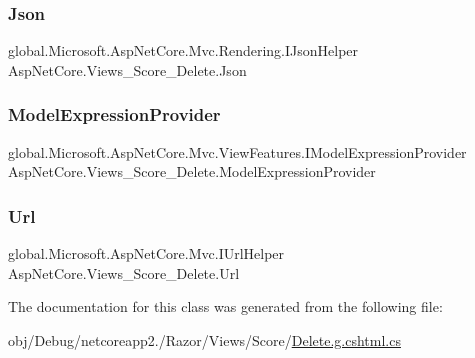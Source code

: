 \subsubsection{\texorpdfstring{Json}{Json}}
{\footnotesize\ttfamily global.\+Microsoft.\+Asp\+Net\+Core.\+Mvc.\+Rendering.\+I\+Json\+Helper Asp\+Net\+Core.\+Views\+\_\+\+Score\+\_\+\+Delete.\+Json\hspace{0.3cm}{\ttfamily [get]}}

\mbox{\label{class_asp_net_core_1_1_views___score___delete_a9ff3c73a1eb11862f9a5bf1b0018cb12}} 
\subsubsection{\texorpdfstring{ModelExpressionProvider}{ModelExpressionProvider}}
{\footnotesize\ttfamily global.\+Microsoft.\+Asp\+Net\+Core.\+Mvc.\+View\+Features.\+I\+Model\+Expression\+Provider Asp\+Net\+Core.\+Views\+\_\+\+Score\+\_\+\+Delete.\+Model\+Expression\+Provider\hspace{0.3cm}{\ttfamily [get]}}

\mbox{\label{class_asp_net_core_1_1_views___score___delete_a590e7d7f782ebbc6e7b724205d23238b}} 
\subsubsection{\texorpdfstring{Url}{Url}}
{\footnotesize\ttfamily global.\+Microsoft.\+Asp\+Net\+Core.\+Mvc.\+I\+Url\+Helper Asp\+Net\+Core.\+Views\+\_\+\+Score\+\_\+\+Delete.\+Url\hspace{0.3cm}{\ttfamily [get]}}



The documentation for this class was generated from the following file\+:\begin{DoxyCompactItemize}
\item 
obj/\+Debug/netcoreapp2./\+Razor/\+Views/\+Score/\mbox{\hyperlink{_delete_8g_8cshtml_8cs}{Delete.\+g.\+cshtml.\+cs}}\end{DoxyCompactItemize}
